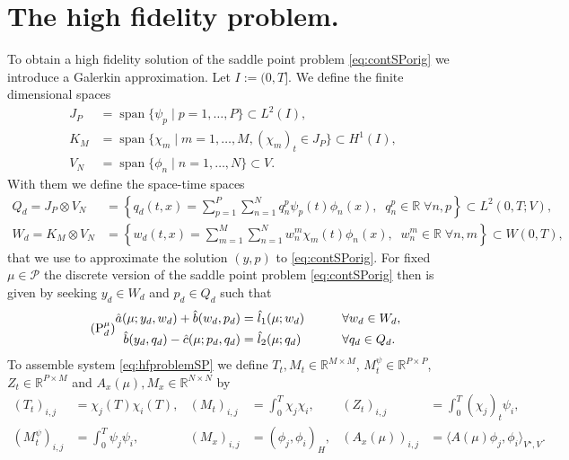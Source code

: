 \documentclass{article}
\theoremstyle{plain}
\theoremstyle{definition}
\theoremstyle{remark}
\DeclareMathOperator{\Span}{span}
\newcommand{\RR}{\mathbb{R}}
\begin{document}
\section{The high fidelity problem.}\label{sec:FE}
To obtain a high fidelity solution of the saddle point problem \eqref{eq:contSPorig} we introduce a Galerkin approximation. Let $I := (0,T]$. We define the finite dimensional spaces
\begin{align}
J_P &= \Span\{\psi_p\mid p=1,\ldots,P\} \subset L^2(I), \label{JP} \\
K_M &= \Span\{\chi_m\mid m=1,\ldots, M, (\chi_m)_t \in J_P\} \subset H^1(I), \label{KM} \\
V_N &= \Span\{\phi_n\mid n=1,\ldots,N\} \subset V. \label{VN}
\end{align}
With them we define the space-time spaces
\begin{align} 
    Q_d = J_P \otimes V_N &=
    \left\lbrace q_d(t,x)=\sum_{p=1}^P\sum_{n=1}^N q_n^p\psi_p(t)\phi_n(x), \;\; q_n^p \in \RR \; \forall n,p \right\rbrace \subset L^2(0,T;V), \label{eq:Qd}\\
    W_d = K_M \otimes V_N &= 
    \left\lbrace w_d(t,x)=\sum_{m=1}^M\sum_{n=1}^N w_n^m\chi_m(t)\phi_n(x), \;\; w_n^m \in \RR \; \forall n,m \right\rbrace \subset W(0,T), \label{eq:Wd}
\end{align}
that we use to approximate the solution $(y,p)$ to \eqref{eq:contSPorig}. For fixed $\mu \in \mathcal{P}$ the discrete version of the saddle point problem \eqref{eq:contSPorig} then is given by
seeking $y_d \in W_d$ and $p_d \in Q_d$ such that
\begin{equation}\tag{\ensuremath{\text P^\mu_\ensuremath{d}}}\label{eq:hfproblemSP}
\begin{aligned}
    \hat{a}(\mu; y_d,w_d) + \hat{b}(w_d,p_d) &= \hat{l}_1(\mu; w_d) \qquad &&\forall w_d \in W_d ,\\
    \hat{b}(y_d,q_d) -\hat{c}(\mu; p_d,q_d) &= \hat{l}_2(\mu; q_d) \qquad &&\forall q_d \in Q_d.
\end{aligned}    
\end{equation}
To assemble system \eqref{eq:hfproblemSP} we define $T_t, M_t \in \RR^{M \times M}$, $M_t^\psi \in \RR^{P \times P}$, $Z_t \in \RR^{P \times M}$ and
$A_x(\mu),M_x \in \RR^{N\times N}$ by
\begin{align}
    (T_t)_{i,j}&= \chi_j(T)\chi_i(T),
    & (M_t)_{i,j} &= \int_0^T \chi_j\chi_i, 
    & (Z_t)_{i,j}&= \int_0^T (\chi_j)_t \psi_i, \\
    (M_t^\psi)_{i,j} &= \int_0^T \psi_j\psi_i, 
    & (M_x)_{i,j} &= (\phi_j,\phi_i)_H,
    &(A_x(\mu))_{i,j} &= \langle A(\mu)\phi_j,\phi_i \rangle_{V^\star, V}.
\end{align}
\end{document}
